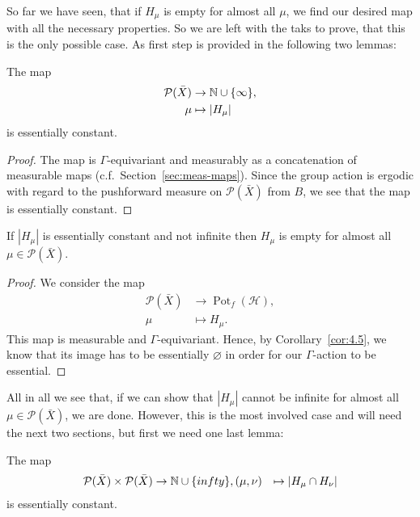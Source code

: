 So far we have seen, that if \(H_\mu\) is empty for almost all \(\mu\), we find our desired map with all the necessary properties. So we are left with the taks to prove, that this is the only possible case. As first step is provided in the following two lemmas:

\begin{lemma}
  \label{lem:h-const}
  The map
  \begin{align*}
    \mathcal{P}(\bar X) &\to \mathbb{N} \cup \{\infty\},\\
    \mu &\mapsto |H_\mu|
  \end{align*}
  is essentially constant.
\end{lemma}

\begin{proof}
  The map is \(\Gamma\)-equivariant and measurably as a concatenation of measurable maps (c.f.~Section~\ref{sec:meas-maps}). Since the group action is ergodic with regard to the pushforward measure on \(\mathcal{P}(\bar X)\) from \(B\), we see that the map is essentially constant.
\end{proof}

\begin{lemma}
  \label{lem:finite-zero}
  If \(|H_\mu|\) is essentially constant and not infinite then \(H_\mu\) is empty for almost all \(\mu \in \mathcal{P}(\bar X)\).
\end{lemma}

\begin{proof}
  We consider the map
  \begin{align*}
    \mathcal{P}(\bar X) & \to \operatorname{Pot}_f(\mathcal{H}),\\
    \mu & \mapsto H_\mu.
  \end{align*}
  This map is measurable and \(\Gamma\)-equivariant. Hence, by Corollary~\ref{cor:4.5}, we know that its image has to be essentially \(\varnothing\) in order for our \(\Gamma\)-action to be essential.
\end{proof}

All in all we see that, if we can show that \(|H_\mu|\) cannot be infinite for almost all \(\mu \in \mathcal{P}(\bar X)\), we are done. However, this is the most involved case and will need the next two sections, but first we need one last lemma:

\begin{lemma}
  \label{lem:hh-const}
  The map
  \begin{align*}
    \mathcal{P}(\bar X) \times \mathcal{P}(\bar X) &\to \mathbb{N} \cup \{infty\},
    (\mu, \nu) &\mapsto |H_\mu \cap H_\nu|
  \end{align*}
  is essentially constant.
\end{lemma}

